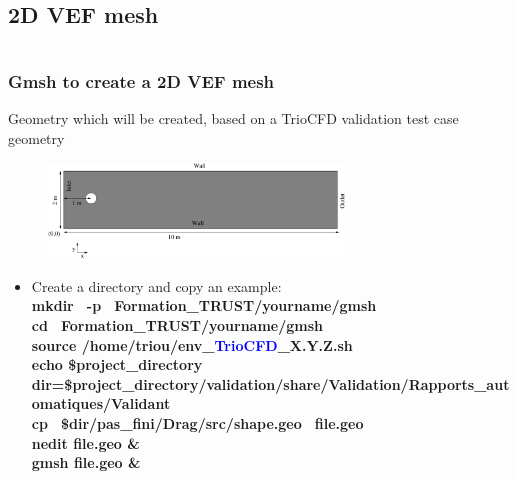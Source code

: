 \documentclass[10pt, hyperref={unicode=true,pdfusetitle, bookmarks=true,bookmarksnumbered=false,bookmarksopen=false, breaklinks=false,pdfborder={0 0 1},backref=true,colorlinks=true,linkcolor=darkblue,pageanchor}]{beamer}
\begin{document}
\subsection{2D VEF mesh}
\begin{frame}
\begin{small}
\begin{columns}[c] 
\tableofcontents[sections={1-9},currentsection, currentsubsection]
\tableofcontents[sections={10-16},currentsection, currentsubsection]
\end{columns}
\end{small}
\end{frame}
\begin{frame}
\frametitle{Gmsh to create a 2D VEF mesh}
\begin{block}{Geometry which will be created, based on a TrioCFD validation test case geometry}

\begin{figure}
\includegraphics[width=0.7\textwidth]{PICTURES/gmsh.pdf}
\end{figure}

\begin{itemize}
\item Create a directory and copy an example:\\
{\footnotesize{
\textbf{mkdir \, -p \, Formation\_TRUST/yourname/gmsh} \\
\textbf{cd \, Formation\_TRUST/yourname/gmsh} \\
\textbf{source /home/triou/env\_\textcolor{blue}{TrioCFD}\_X.Y.Z.sh }\\
\textbf{echo \$project\_directory} \\
\textbf{dir=\$project\_directory/validation/share/Validation/Rapports\_automatiques/Validant} \\
\textbf{cp \, \$dir/pas\_fini/Drag/src/shape.geo \, file.geo} \\
\textbf{nedit file.geo \& } \\
\textbf{gmsh file.geo \&} }}\\
\end{itemize}

\end{block}
\end{frame}
\end{document}
